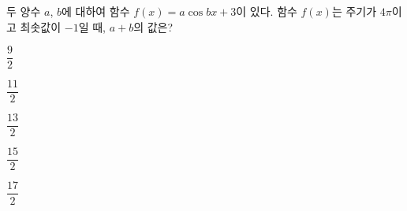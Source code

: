 두 양수 $a$, $b$에 대하여 함수 $f(x)=a\cos bx+3$이 있다. 함수 $f(x)$는 주기가 $4\pi$이고 최솟값이 $-1$일 때, $a+b$의 값은?
\begin{choices32}{\rule[-3ex]{0pt}{8ex}$\dfrac{9}{2}$}{\rule[-3ex]{0pt}{8ex}$\dfrac{11}{2}$}{\rule[-3ex]{0pt}{8ex}$\dfrac{13}{2}$}{\rule[-3ex]{0pt}{8ex}$\dfrac{15}{2}$}{\rule[-3ex]{0pt}{8ex}$\dfrac{17}{2}$}\end{choices32}
